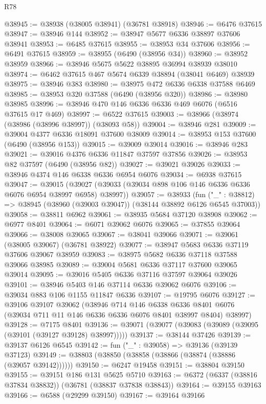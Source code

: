 \begin{lexlean}{R78}
\begin{coremodule}
@38945 := @38938 (@38005 @38941) (@36781 @38918)
@38946 := @6476 @37615
@38947 := @38946 @144
@38952 := @38947 @5677 @6336 @38897 @37606 @38941
@38953 := @6485 @37615
@38955 := @38953 @34 @37606
@38956 := @6491 @37615
@38959 := @38955 (@6490 (@38956 @34))
@38960 := @38952 @38959
@38966 := @38946 @5675 @5622 @38895 @36994 @38939 @38010
@38974 := @6462 @37615 @467 @5674 @6339 @38894 (@38041 @6469) @38939
@38975 := @38946 @383
@38980 := @38975 @472 @6336 @6338 @37588 @6469
@38985 := @38953 @320 @37588 (@6490 (@38956 @320))
@38986 := @38980 @38985
@38996 := @38946 @470 @146 @6336 @6336 @469 @6076 (@6516 @37615 @17 @469)
@38997 := @6522 @37615
@39003 := @38966 (@38974 (@38986 (@38996 @38997)) (@38093 @58))
@39004 := @38946 @281
@39009 := @39004 @4377 @6336 @18091 @37600 @38009
@39014 := @38953 @153 @37600 (@6490 (@38956 @153))
@39015 := @39009 @39014
@39016 := @38946 @283
@39021 := @39016 @4376 @6336 @11847 @37597 @37856
@39026 := @38953 @82 @37597 (@6490 (@38956 @82))
@39027 := @39021 @39026
@39033 := @38946 @4374 @146 @6338 @6336 @6954 @6076
@39034 := @6938 @37615
@39047 := @39015
    (@39027 (@39033 (@39034 @898 @106 @146 @6336 @6336 @6076 @6954 @38997 @6958) @38997))
@39057 := @38933
    (fun ("_" : @38812) => @38945 (@38960 (@39003 @39047)) (@38144 @38892 @6126 @6545 @37003))
@39058 := @38811 @6962
@39061 := @38935 @5684 @37120 @38908
@39062 := @6977 @8401
@39064 := @6071 @39062 @6076
@39065 := @37855 @39064
@39066 := @38008 @39065
@39067 := @38041 @39066
@39071 := @39061 (@38005 @39067) (@36781 @38922)
@39077 := @38947 @5683 @6336 @37119 @37606 @39067 @38959
@39083 := @38975 @5682 @6336 @37118 @37588 @39066 @38985
@39089 := @39004 @5681 @6336 @37117 @37600 @39065 @39014
@39095 := @39016 @5405 @6336 @37116 @37597 @39064 @39026
@39101 := @38946 @5403 @146 @37114 @6336 @39062 @6076
@39106 := @39034 @883 @106 @1155 @11847 @6336
@39107 := @19795 @6076
@39127 := @39106
    @39107
    @39062
    (@38946
      @714
      @146
      @6338
      @6336
      @8401
      @6076
      (@39034 @711 @11 @146 @6336 @6336 @6076 @8401 @38997 @8404)
      @38997)
@39128 := @7175 @8401
@39136 := @39071 (@39077 (@39083 (@39089 (@39095 (@39101 (@39127 @39128) @38997)))))
@39137 := @38144 @37426
@39139 := @39137 @6126 @6545
@39142 := fun ("_" : @39058) => @39136 (@39139 @37123)
@39149 := @38803 (@38850 (@38858 (@38866 (@38874 (@38886 (@39057 @39142))))))
@39150 := @6247 @19458
@39151 := @38804 @39150
@39155 := @39151 @186 @131 @5625 @5710
@39163 := @6372 (@6337 (@38816 @37834 @38832)) (@36781 (@38837 @37838 @38843))
@39164 := @39155 @39163
@39166 := @6588 (@29299 @39150)
@39167 := @39164 @39166

\end{coremodule}
\end{lexlean}
